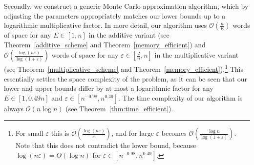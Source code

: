 \documentclass{article}[11pt,letter]
\newcommand{\bigo}{\mathcal{O}}
\newcommand{\aerr}{\ensuremath{E}}
\begin{document}
Secondly, we construct a generic 
Monte Carlo approximation algorithm, which by adjusting the parameters appropriately matches our lower bounds up to a logarithmic multiplicative 
factor.
In more detail, our algorithm uses $\bigo(\frac{n}{\aerr})$ words of space for any $\aerr \in [1,n]$ in the additive variant (see Theorem~\ref{additive_scheme} and
Theorem~\ref{memory_efficient}) and $\bigo(\frac{\log (n\varepsilon)}{\log(1+\varepsilon)})$ words of space for any $\varepsilon \in [\frac2n,n]$
in the multiplicative variant (see Theorem~\ref{multiplicative_scheme} and Theorem~\ref{memory_efficient}).\footnote{For 
small $\varepsilon$ this is $\bigo(\frac{\log(n\varepsilon)}{\varepsilon})$, and for large $\varepsilon$ becomes $\bigo(\frac{\log n}{\log(1+\varepsilon)})$.
Note that this does not contradict the lower bound, because $\log(n\varepsilon)=\Theta(\log n)$ for $\varepsilon\in[n^{-0.98},n^{0.49}]$.}
This essentially settles the space complexity of the problem, as it can be seen that our lower and upper bounds differ by at most a logarithmic factor
for any $\aerr \in [1,0.49n]$ and $\varepsilon \in [n^{-0.98},n^{0.49}]$.
The time complexity of our algorithm is always $\bigo(n\log n)$ (see Theorem~\ref{thm:time_efficient}).
\end{document}
